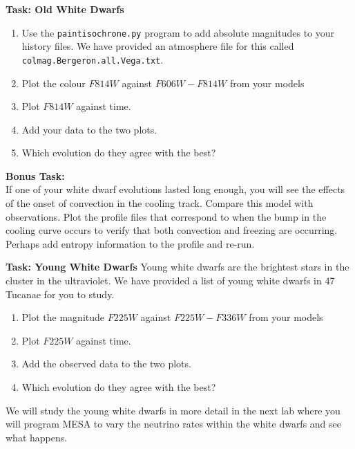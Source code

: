 \documentclass{article}
\begin{document}
\textbf{Task: Old White Dwarfs}\vspace{-1em}
\begin{enumerate}
 \setlength\itemsep{0em}
\item Use the \texttt{paintisochrone.py} program to add absolute magnitudes to your history files.  We have provided an atmosphere file for this called \texttt{colmag.Bergeron.all.Vega.txt}.
\item Plot the colour $F814W$ against $F606W-F814W$ from your models
\item Plot $F814W$ against time.
\item Add your data to the two plots.  
\item Which evolution do they agree with the best?
\end{enumerate}

\textbf{Bonus Task:}\\
If one of your white dwarf evolutions lasted long enough, you will see the effects of the onset of convection in the cooling track.  Compare this model with observations.   Plot the profile files that correspond to when the bump in the cooling curve occurs to verify that both convection and freezing are occurring.   Perhaps add entropy information to the profile and re-run. 


\textbf{Task: Young White Dwarfs}
Young white dwarfs are the brightest stars in the cluster in the ultraviolet.  We have provided a list of young white dwarfs in 47 Tucanae for you to study.
\begin{enumerate}
 \setlength\itemsep{0em}
\item Plot the magnitude $F225W$ against $F225W-F336W$ from your models
\item Plot $F225W$ against time.
\item Add the observed  data to the two plots.  
\item Which evolution do they agree with the best?
\end{enumerate}


We will study the young white dwarfs in more detail in the next lab where you will program MESA to vary the neutrino rates within the white dwarfs and see what happens.
\end{document}
